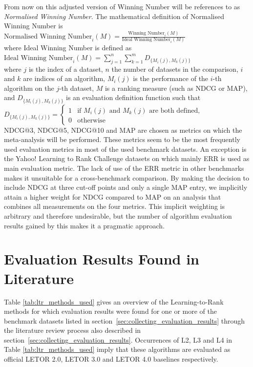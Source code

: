 \documentclass{sig-alternate-2013}
\begin{document}
From now on this adjusted version of Winning Number will be references to as \emph{Normalised Winning Number}. The mathematical definition of Normalised Winning Number is\\

$\text{Normalised Winning Number}_i(M) = \frac{\text{Winning Number}_i(M)}{\text{Ideal Winning Number}_i(M)}$\\

\noindent
where Ideal Winning Number is defined as\\

$\text{Ideal Winning Number}_i(M) = \sum\nolimits_{j=1}^n \sum\nolimits_{k=1}^m D_{\{M_i(j),M_k(j)\}}$\\

where $j$ is the index of a dataset, $n$ the number of datasets in the comparison, $i$ and $k$ are indices of an algorithm, $M_i(j)$ is the performance of the $i$-th algorithm on the $j$-th dataset, $M$ is a ranking measure (such as NDCG or MAP), and $D_{\{M_i(j),M_k(j)\}}$ is an evaluation definition function such that\\

$D_{\{M_i(j),M_k(j)\}} = \begin{cases}
1 & \text{if } M_i(j) \text{ and } M_k(j) \text{ are both defined}, \\
0 & \text{otherwise}
\end{cases}$\\

NDCG@3, NDCG@5, NDCG@10 and MAP are chosen as metrics on which the meta-analysis will be performed. These metrics seem to be the most frequently used evaluation metrics in most of the used benchmark datasets. An exception is the Yahoo! Learning to Rank Challenge datasets on which mainly ERR is used as main evaluation metric. The lack of use of the ERR metric in other benchmarks makes it unsuitable for a cross-benchmark comparison. By making the decision to include NDCG at three cut-off points and only a single MAP entry, we implicitly attain a higher weight for NDCG compared to MAP on an analysis that combines all measurements on the four metrics. This implicit weighting is arbitrary and therefore undesirable, but the number of algorithm evaluation results gained by this makes it a pragmatic approach.

\section{Evaluation Results Found in Literature}
Table \ref{tab:ltr_methods_used} gives an overview of the Learning-to-Rank methods for which evaluation results were found for one or more of the benchmark datasets listed in section~\ref{sec:collecting_evaluation_results} through the literature review process also described in section~\ref{sec:collecting_evaluation_results}. Occurrences of L2, L3 and L4 in Table \ref{tab:ltr_methods_used} imply that these algorithms are evaluated as official LETOR 2.0, LETOR 3.0 and LETOR 4.0 baselines respectively.\\
\end{document}
